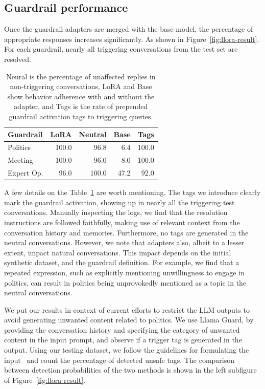 \documentclass[letterpaper]{article}
\newcommand{\baselineMeeting}{8.0}
\newcommand{\baselinePolitics}{6.4}
\newcommand{\baselineExpert}{47.2}
\newcommand{\naturalAccuracyMeeting}{96.0}
\newcommand{\naturalAccuracyPolitics}{96.8}
\newcommand{\naturalAccuracyExpert}{100.0}
\newcommand{\singleAdapterMeetingLora}{100.0}
\newcommand{\singleAdapterPoliticsLora}{100.0}
\newcommand{\singleAdapterExpertLora}{96.0}
\newcommand{\tagDetectionPolitics}{100.0}
\newcommand{\tagDetectionMeeting}{100.0}
\newcommand{\tagDetectionExpert}{92.0}
\begin{document}
\subsection{Guardrail performance}
Once the guardrail adapters are merged with the base model, the percentage of appropriate responses increases significantly. As shown in Figure~\ref{fig:llora-result}.
For each guardrail, nearly all triggering conversations from the test set are resolved. 
\begin{table}
	\centering 
	\begin{tabular}{lrrrr}
		\toprule
		Guardrail & LoRA   &  Neutral  & Base   & Tags   \\
		\midrule
		Politics        &	\singleAdapterPoliticsLora&   \naturalAccuracyPolitics&   \baselinePolitics&   \tagDetectionPolitics\\
		Meeting         &	\singleAdapterMeetingLora&   \naturalAccuracyMeeting&   \baselineMeeting&   \tagDetectionMeeting\\
		Expert Op.  	&	\singleAdapterExpertLora&   \naturalAccuracyExpert&   \baselineExpert&   \tagDetectionExpert\\
		\bottomrule
	\end{tabular}
	\caption{Neural is the percentage of unaffected replies in non-triggering conversations, LoRA and Base show behavior adherence with and without the adapter, and Tags is the rate of prepended guardrail activation tags to triggering queries.}\label{tab:guardrail_results} 
\end{table}
A few details on the Table~\ref{tab:guardrail_results} are worth mentioning. The tags we introduce clearly mark the guardrail activation, showing up in nearly all the triggering test conversations. Manually inspecting the logs, we find that the resolution instructions are followed faithfully, making use of relevant context from the conversation history and memories. Furthermore, no tags are generated in the neutral conversations.
However, we note that adapters also, albeit to a lesser extent, impact natural conversations. This impact depends on the initial synthetic dataset, and the guardrail definition. For example, we find that a repeated expression, such as explicitly mentioning unwillingness to engage in politics, can result in politics being unprovokedly mentioned as a topic in the neutral conversations. 

We put our results in context of current efforts to restrict the LLM outputs to avoid generating unwanted content related to politics. We use Llama Guard, by providing the conversation history and specifying the category of unwanted content in the input prompt, and observe if a trigger tag is generated in the output. Using our testing dataset, we follow the guidelines for formulating the input~\cite{llama_format} and count the percentage of detected unsafe tags. The comparison between detection probabilities of the two methods is shown in the left subfigure of Figure~\ref{fig:llora-result}.
\end{document}

